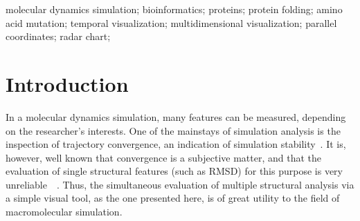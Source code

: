 \documentclass[10pt, conference]{IEEEtran}
\begin{document}
\maketitle


\begin{abstract}

%
\end{abstract}

\begin{IEEEkeywords}
molecular dynamics simulation; bioinformatics; proteins; protein folding; amino acid mutation; temporal visualization; multidimensional visualization; parallel coordinates; radar chart;

\end{IEEEkeywords}


\IEEEpeerreviewmaketitle




\section{Introduction}
%

In a molecular dynamics simulation, many features can be measured, depending on the researcher’s interests. One of the mainstays of simulation analysis is the inspection of trajectory convergence, an indication of simulation stability~\cite{grossfield2007convergence}. It is, however, well known that convergence is a subjective matter, and that the evaluation of single structural features (such as RMSD) for this purpose is very unreliable~\cite{knapp2011intuitive}~\cite{van2006biomolecular}. Thus, the simultaneous evaluation of multiple structural analysis via a simple visual tool, as the one presented here, is of great utility to the field of macromolecular simulation.
\end{document}
